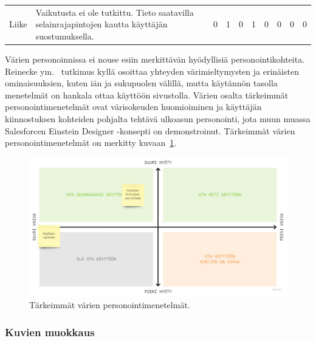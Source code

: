 \documentclass[finnish, 12pt, a4paper, elec, utf8, a-1b, online]{aaltothesis}
\begin{document}
{\begin{longtable}{p{2.5cm}|p{6cm}|p{0.5cm}p{0.5cm}p{0.5cm}|p{0.5cm}|p{0.5cm}p{0.5cm}p{0.5cm}|p{0.5cm}|}
        \midrule
        Liike                                  & Vaikutusta ei ole tutkittu. Tieto saatavilla selainrajapintojen kautta käyttäjän suostumuksella.                                                                                                                                                                                                                         & 0                                          & 1                                   & 0                                      & 1                            & 0                                               & 0                                         & 0                                         & 0                            \\
    \end{longtable}
}

Värien personoinnissa ei nouse esiin merkittävän hyödyllisiä
personointikohteita. Reinecke ym.~\cite{10.1145/2556288.2557052} tutkimus kyllä
osoittaa yhteyden värimieltymysten ja erinäisten ominaisuuksien, kuten iän ja
sukupuolen välillä, mutta käytännön tasolla menetelmät on hankala ottaa käyttöön
sivustolla. Värien osalta tärkeimmät personointimenetelmät ovat värisokeuden
huomioiminen ja käyttäjän kiinnostuksen kohteiden pohjalta tehtävä ulkoasun
personointi, jota muun muassa Salesforcen Einstein Designer -konsepti on
demonstroinut. Tärkeimmät värien personointimenetelmät on merkitty
kuvaan~\ref{fig:color-priorization}.

\begin{figure}[htb]
    \centering
    \includegraphics[width=\textwidth]{images/color-priorization.pdf}
    \caption{Tärkeimmät värien personointimenetelmät.~\label{fig:color-priorization}}
\end{figure}

\subsubsection{Kuvien muokkaus}
\end{document}
